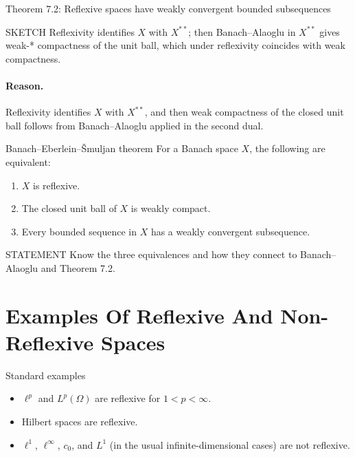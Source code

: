 \documentclass[header={Lecture 4 Exam Study Notes}]{study-note}
\begin{document}
\begin{thmbox}{Theorem 7.2: Reflexive spaces have weakly convergent bounded subsequences}
\thmReflexiveWeaklyCompact
\end{thmbox}

\begin{prooflevelbox}{SKETCH}
Reflexivity identifies $X$ with $X^{**}$; then Banach--Alaoglu in $X^{**}$ gives weak-* compactness of the unit ball, which under reflexivity coincides with weak compactness.
\end{prooflevelbox}

\paragraph{Reason.}
Reflexivity identifies $X$ with $X^{**}$, and then weak compactness of the closed unit ball follows from Banach--Alaoglu applied in the second dual.

\begin{thmbox}{Banach--Eberlein--\v Smuljan theorem}
For a Banach space $X$, the following are equivalent:
\begin{enumerate}
\item $X$ is reflexive.
\item The closed unit ball of $X$ is weakly compact.
\item Every bounded sequence in $X$ has a weakly convergent subsequence.
\end{enumerate}
\end{thmbox}

\begin{prooflevelbox}{STATEMENT}
Know the three equivalences and how they connect to Banach--Alaoglu and Theorem 7.2.
\end{prooflevelbox}

\section{Examples Of Reflexive And Non-Reflexive Spaces}

\begin{exbox}{Standard examples}
\begin{itemize}
\item $\ell^p$ and $L^p(\Omega)$ are reflexive for $1<p<\infty$.
\item Hilbert spaces are reflexive.
\item $\ell^1$, $\ell^\infty$, $c_0$, and $L^1$ (in the usual infinite-dimensional cases) are not reflexive.
\end{itemize}
\end{exbox}
\end{document}
